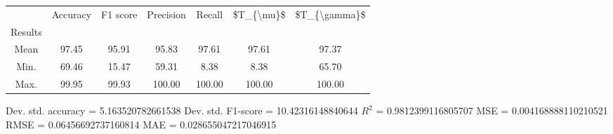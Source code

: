 \begin{tabular}{|c|c|c|c|c|c|c|}
\toprule
{} &  Accuracy &  F1 score &  Precision &  Recall &  \$T\_\{\textbackslash mu\}\$ &  \$T\_\{\textbackslash gamma\}\$ \\
Results &           &           &            &         &            &               \\
\hline
Mean    &     97.45 &     95.91 &      95.83 &   97.61 &      97.61 &         97.37 \\
Min.    &     69.46 &     15.47 &      59.31 &    8.38 &       8.38 &         65.70 \\
Max.    &     99.95 &     99.93 &     100.00 &  100.00 &     100.00 &        100.00 \\
\bottomrule
\end{tabular}

 Dev. std. accuracy = 5.163520782661538
 Dev. std. F1-score = 10.42316148840644
 $R^2$ = 0.9812399116805707
 MSE = 0.004168888110210521
 RMSE = 0.06456692737160814
 MAE = 0.028655047217046915